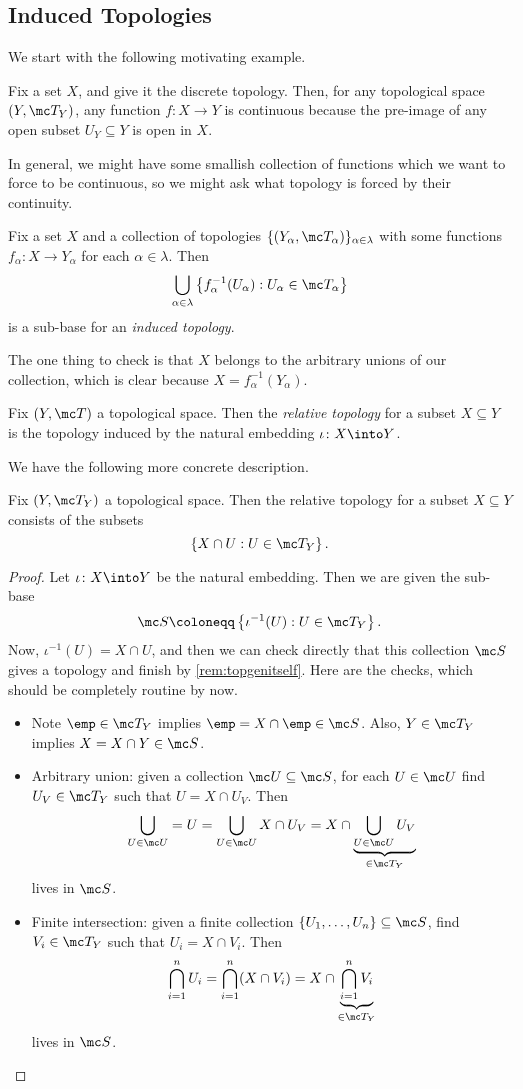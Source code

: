 \documentclass[../notes.tex]{subfiles}
\begin{document}
\subsection{Induced Topologies}
We start with the following motivating example.
\begin{example}
	Fix a set $X$, and give it the discrete topology. Then, for any topological space $(Y,\mc T_Y)$, any function $f\colon X\to Y$ is continuous because the pre-image of any open subset $U_Y\subseteq Y$ is open in $X$.
\end{example}
In general, we might have some smallish collection of functions which we want to force to be continuous, so we might ask what topology is forced by their continuity.
\begin{defihelper} 
	Fix a set $X$ and a collection of topologies $\{(Y_\alpha,\mc T_\alpha)\}_{\alpha\in\lambda}$ with some functions $f_\alpha\colon X\to Y_\alpha$ for each $\alpha\in\lambda$. Then
	\[\bigcup_{\alpha\in\lambda}\left\{f_\alpha^{-1}(U_\alpha):U_\alpha\in\mc T_\alpha\right\}\]
	is a sub-base for an \textit{induced topology}.
\end{defihelper}
The one thing to check is that $X$ belongs to the arbitrary unions of our collection, which is clear because $X=f^{-1}_\alpha(Y_\alpha)$.
\begin{defihelper} 
	Fix $(Y,\mc T)$ a topological space. Then the \textit{relative topology} for a subset $X\subseteq Y$ is the topology induced by the natural embedding $\iota\colon X\into Y$.
\end{defihelper}
We have the following more concrete description.
\begin{lemma}
	Fix $(Y,\mc T_Y)$ a topological space. Then the relative topology for a subset $X\subseteq Y$ consists of the subsets
	\[\left\{X\cap U:U\in\mc T_Y\right\}.\]
\end{lemma}
\begin{proof}
	Let $\iota\colon X\into Y$ be the natural embedding. Then we are given the sub-base
	\[\mc S\coloneqq\left\{\iota^{-1}(U):U\in\mc T_Y\right\}.\]
	Now, $\iota^{-1}(U)=X\cap U$, and then we can check directly that this collection $\mc S$ gives a topology and finish by \autoref{rem:topgenitself}. Here are the checks, which should be completely routine by now.
	\begin{itemize}
		\item Note $\emp\in\mc T_Y$ implies $\emp=X\cap\emp\in\mc S$. Also, $Y\in\mc T_Y$ implies $X=X\cap Y\in\mc S$.
		\item Arbitrary union: given a collection $\mc U\subseteq\mc S$, for each $U\in\mc U$ find $U_V\in\mc T_Y$ such that $U=X\cap U_V$. Then
		\[\bigcup_{U\in\mc U}=U=\bigcup_{U\in\mc U}X\cap U_V=X\cap\underbrace{\bigcup_{U\in\mc U}U_V}_{\in\mc T_Y}\]
		lives in $\mc S$.
		\item Finite intersection: given a finite collection $\{U_1,\ldots,U_n\}\subseteq\mc S$, find $V_i\in\mc T_Y$ such that $U_i=X\cap V_i$. Then
		\[\bigcap_{i=1}^nU_i=\bigcap_{i=1}^n(X\cap V_i)=X\cap\underbrace{\bigcap_{i=1}^nV_i}_{\in\mc T_Y}\]
		lives in $\mc S$.
		\qedhere
	\end{itemize}
\end{proof}
\end{document}
